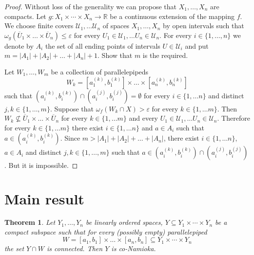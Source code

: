 \documentclass{amsart}
\newtheorem{theorem}{Theorem}[section]
\begin{document}
\begin{proof} Without loss of the generality we can propose that $X_1,\dots, X_n$ are compacts. Let  $g:X_1\times\cdots \times X_n\to\mathbb R$ be a continuous extension of the mapping $f$. We choose finite covers ${\mathcal U_1},\dots {\mathcal U_n}$ of spaces $X_1,\dots, X_n$ by open intervals such that  $\omega_g(\overline{U}_1\times\dots\times \overline{U}_n)\leq\varepsilon$ for every $U_1\in{\mathcal U_1},\dots U_n\in{\mathcal U_n}$. For every $i\in \{1,\dots, n\}$ we denote by $A_i$ the set of all ending points of intervals $U\in{\mathcal U}_i$ and put $m=|A_1|+|A_2|+\dots +|A_n|+1$. Show that $m$ is the required.

Let $W_1,\dots, W_m$ be a collection of parallelepipeds $$W_k=[a_1^{(k)},b_1^{(k)}]\times\dots\times [a_n^{(k)},b_n^{(k)}]$$ such that $(a_i^{(k)},b_i^{(k)})\cap(a_i^{(j)},b_i^{(j)})=\emptyset$ for every $i\in\{1,\dots n\}$ and distinct $j,k\in \{1,\dots, m\}$. Suppose that $\omega_f(W_{k}\cap X)> \varepsilon$ for every $k\in\{1,\dots m\}$. Then $W_k\not\subseteq \overline{U}_1\times\dots\times \overline{U}_n$ for every $k\in\{1,\dots m\}$ and every $U_1\in{\mathcal U_1},\dots U_n\in{\mathcal U_n}$. Therefore for every $k\in\{1,\dots m\}$ there exist $i\in\{1,\dots n\}$ and $a\in A_i$ such that $a\in (a_i^{(k)},b_i^{(k)})$. Since $m>|A_1|+|A_2|+\dots +|A_n|$, there exist $i\in\{1,\dots n\}$, $a\in A_i$ and distinct $j,k\in \{1,\dots, m\}$ such that $a\in (a_i^{(k)},b_i^{(k)})\cap(a_i^{(j)},b_i^{(j)})$. But it is impossible.
\end{proof}

\section{Main result}

\begin{theorem}\label{th:4.1}
Let $Y_1,\dots, Y_n$ be linearly ordered spaces, $Y\subseteq Y_1\times\cdots \times Y_n$ be a compact subspace such that for every (possibly empty) parallelepiped $$W=[a_1,b_1]\times\dots\times [a_n,b_n]\subseteq Y_1\times\cdots \times Y_n$$ the set $Y\cap W$ is connected. Then $Y$ is co-Namioka.
\end{theorem}
\end{document}
